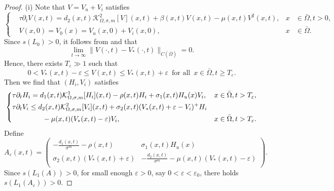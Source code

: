 \documentclass[11pt,reqno]{amsart}
\numberwithin{equation}{section}
\begin{document}
\begin{proof}
(i)
Note that $V=V_{u}+V_{i}$ satisfies
\begin{equation*}  	
\left\{
\begin{aligned}
&\tau \partial_{t} V(x,t)
=d_{2}(x,t)\mathcal{K}^{2}_{\Omega,\sigma,m}[V](x,t) + \beta(x,t)V(x,t) - \mu(x,t)V^{2}(x,t), &x& \in\bar{\Omega}, t>0,\\
&V(x,0)=V_{0}(x)=V_{u}(x,0)+V_{i}(x,0), &x&\in\bar{\Omega}.
\end{aligned}
\right.
\end{equation*}
Since $ s(L_{0})>0 $,
it follows from \cite[Theorem E]{RS}  and  \cite[Theorem B]{ShenVo}  that
%
\begin{equation}\label{4-6}
\lim\limits_{t\to\infty}\|V(\cdot, t)-V_{*}(\cdot, t)\|_{C(\bar{\Omega})}=0.
\end{equation}
%
Hence, there exists $T_{\varepsilon}\gg 1$ such that
%
\begin{equation*}
0<V_{*}(x,t)-\varepsilon\le V(x,t) \le V_{*}(x,t)+\varepsilon \enspace\text{for all}\enspace  x\in\bar{\Omega}, t\geq T_{\varepsilon}.
\end{equation*}
%
Then we find that $(H_{i},V_{i})$ satisfies
\begin{equation}\label{4-7}
\left\{
\begin{aligned}
& \tau \partial_{t} H_{i}
=d_{1}(x,t)\mathcal{K}^{1}_{\Omega,\sigma,m}[H_{i}](x,t)-\rho(x,t)H_{i}+\sigma_{1}(x,t)H_{u}(x)V_{i}, &x\in\bar\Omega, t>T_{\varepsilon},\\
& \tau \partial_{t} V_{i}
\le
d_{2}(x,t)\mathcal{K}^{2}_{\Omega,\sigma,m}[V_{i}](x,t)+\sigma_{2}(x,t)(V_{*}(x,t)+\varepsilon-V_{i})^{+}H_{i}\\
&\hspace{1.5cm}-\mu(x,t)(V_{*}(x,t)-\varepsilon)V_{i}, &x\in\bar\Omega, t>T_{\varepsilon}.
\end{aligned}
\right.
\end{equation}
Define 		
\begin{equation*}
A_{\varepsilon}(x,t)=\left(
\begin{array}{cccc}
-\frac{d_{1}(x,t)}{\sigma^{m}}-\rho(x,t) &  \sigma_{1}(x,t)H_{u}(x)\\
\sigma_{2}(x,t)(V_{*}(x,t)+\varepsilon) &  -\frac{d_{2}(x,t)}{\sigma^{m}}-\mu(x,t)(V_{*}(x,t)-\varepsilon)\\
\end{array} \right).
\end{equation*}
Since $s(L_{1}(A))>0$, for small enough $\varepsilon>0$, say $0< \varepsilon <\varepsilon_{0}$, there holds $s(L_{1}(A_{\varepsilon}))>0$.

\end{proof}
\end{document}
